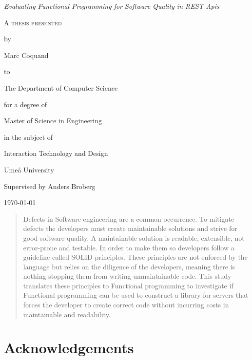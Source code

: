 \documentclass[12pt]{report}
\theoremstyle{definition}
\theoremstyle{theorem}
\begin{document}
\begin{titlepage}
	\centering
    \null
    \vfill
    {\Large\itshape Evaluating Functional Programming for Software Quality in
    REST Apis    \par}
    \vspace{3.0cm}
	{\scshape 
    A thesis presented \par 
    by\par
	Marc Coquand\par
	to\par
    The Department of Computer Science\par
    \vspace{0.8cm}
	for a degree of\par
    Master of Science in Engineering\par
    in the subject of\par
    Interaction Technology and Design\par}
    \vfill
    Umeå University\par
    Supervised by Anders Broberg\par
	\today\par
\end{titlepage}
\clearpage
\thispagestyle{empty}

\clearpage\newpage
\thispagestyle{empty}

\begin{abstract} 
    Defects in Software engineering are a common occurrence. To mitigate defects
    the developers must create maintainable solutions and strive for good
    software quality. A maintainable solution is readable, extensible, not
    error-prone and testable. In order to make them so developers follow a
    guideline called SOLID principles. These principles are not enforced by the
    language but relies on the diligence of the developers, meaning there is
    nothing stopping them from writing unmaintainable code. This study 
    translates these principles to Functional programming to investigate if
    Functional programming can be used to construct a library for servers that
    forces the developer to create correct code without incurring costs in
    maintainable and readability.
\end{abstract}

\clearpage\newpage
\thispagestyle{empty}

\section*{Acknowledgements}
\end{document}
